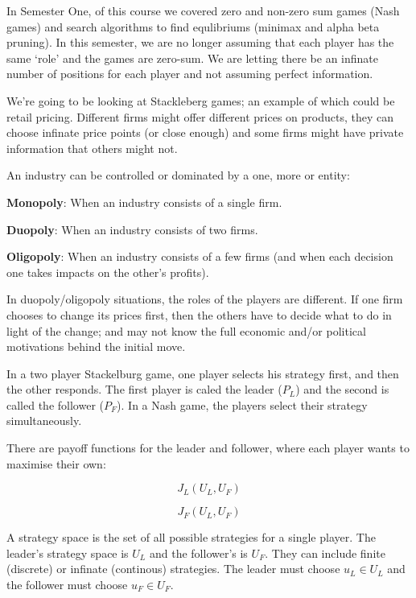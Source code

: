 
In Semester One, of this course we covered zero and non-zero sum games (Nash
games) and search algorithms to find equlibriums (minimax and alpha beta
pruning). In this semester, we are no longer assuming that each player has the
same `role' and the games are zero-sum. We are letting there be an infinate
number of positions for each player and not assuming perfect information.

We're going to be looking at Stackleberg games; an example of which could be
retail pricing. Different firms might offer different prices on products, they
can choose infinate price points (or close enough) and some firms might have
private information that others might not.

An industry can be controlled or dominated by a one, more or entity:

\begin{description}
  \item \textbf{Monopoly}: When an industry consists of a single firm.
  \item \textbf{Duopoly}: When an industry consists of two firms.
  \item \textbf{Oligopoly}: When an industry consists of a few firms (and when
  each decision one takes impacts on the other's profits).
\end{description}

In duopoly/oligopoly situations, the roles of the players are different. If one
firm chooses to change its prices first, then the others have to decide what to
do in light of the change; and may not know the full economic and/or political
motivations behind the initial move.

In a two player Stackelburg game, one player selects his strategy first, and
then the other responds. The first player is caled the leader ($P_L$) and the
second is called the follower ($P_F$). In a Nash game, the players select their
strategy simultaneously.

There are payoff functions for the leader and follower, where each player wants
to maximise their own:

\[
  J_L(U_L, U_F)
\]

\[
  J_F(U_L, U_F)
\]

A strategy space is the set of all possible strategies for a single player. The
leader's strategy space is $U_L$ and the follower's is $U_F$. They can include
finite (discrete) or infinate (continous) strategies. The leader must choose
$u_L \in U_L$ and the follower must choose $u_F \in U_F$.

